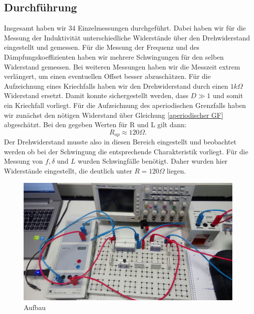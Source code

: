 \documentclass[12pt,a4paper]{article}
\begin{document}
\subsection{Durchführung}
Insgesamt haben wir 34 Einzelmessungen durchgeführt. 
Dabei haben wir für die Messung der Induktivität unterschiedliche Widerstände über den Drehwiderstand eingestellt und gemessen. Für die Messung der Frequenz und des Dämpfungskoeffizienten haben wir mehrere Schwingungen für den selben Widerstand gemessen. Bei weiteren Messungen haben wir die Messzeit extrem verlängert, um einen eventuellen Offset besser abzuschätzen.
\newline
\newline
Für die Aufzeichnung eines Kriechfalls haben wir den Drehwiderstand durch einen $1k\Omega$ Widerstand ersetzt. Damit konnte sichergestellt werden, dass $D\gg 1$ und somit ein Kriechfall vorliegt.
\newline
Für die Aufzeichnung des aperiodischen Grenzfalls haben wir zunächst den nötigen Widerstand über Gleichung \ref{aperiodischer GF} abgeschätzt. Bei den gegeben Werten für R und L gilt dann:
\begin{equation}
R_{ap}\approx 120\Omega.
\end{equation}
Der Drehwiderstand musste also in diesen Bereich eingestellt und beobachtet werden ob bei der Schwingung die entsprechende Charakteristik vorliegt.
\newline
Für die Messung von $f,\delta$ und $L$ wurden Schwingfälle benötigt. Daher wurden hier Widerstände eingestellt, die deutlich unter $R= 120\Omega$ liegen.

\begin{figure}[H]
\caption{Aufbau}
\centering
\includegraphics[scale=0.25]{Bilder/AufbauFoto.jpg}
\end{figure}
\end{document}
